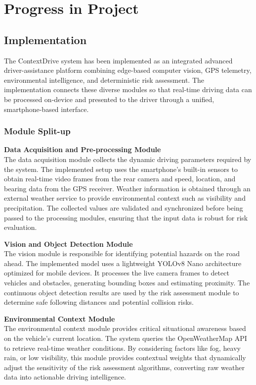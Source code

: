 \chapter{Progress in Project}

\section{Implementation}
The ContextDrive system has been implemented as an integrated advanced driver-assistance platform combining edge-based computer vision, GPS telemetry, environmental intelligence, and deterministic risk assessment. The implementation connects these diverse modules so that real-time driving data can be processed on-device and presented to the driver through a unified, smartphone-based interface.

\subsection{Module Split-up}

\noindent\textbf{Data Acquisition and Pre-processing Module}\\
The data acquisition module collects the dynamic driving parameters required by the system. The implemented setup uses the smartphone's built-in sensors to obtain real-time video frames from the rear camera and speed, location, and bearing data from the GPS receiver. Weather information is obtained through an external weather service to provide environmental context such as visibility and precipitation. The collected values are validated and synchronized before being passed to the processing modules, ensuring that the input data is robust for risk evaluation.

\vspace{0.5em}
\noindent\textbf{Vision and Object Detection Module}\\
The vision module is responsible for identifying potential hazards on the road ahead. The implemented model uses a lightweight YOLOv8 Nano architecture optimized for mobile devices. It processes the live camera frames to detect vehicles and obstacles, generating bounding boxes and estimating proximity. The continuous object detection results are used by the risk assessment module to determine safe following distances and potential collision risks.

\vspace{0.5em}
\noindent\textbf{Environmental Context Module}\\
The environmental context module provides critical situational awareness based on the vehicle's current location. The system queries the OpenWeatherMap API to retrieve real-time weather conditions. By considering factors like fog, heavy rain, or low visibility, this module provides contextual weights that dynamically adjust the sensitivity of the risk assessment algorithms, converting raw weather data into actionable driving intelligence.


